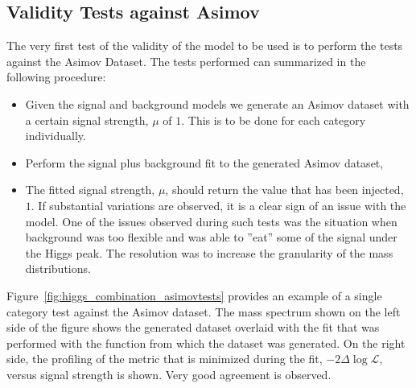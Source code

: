 \subsection{Validity Tests against Asimov}
The very first test of the validity of the model to be used is to perform the
tests against the Asimov Dataset. The tests performed can summarized in the
following procedure:
\begin{itemize}
    \item Given the signal and background models we generate an Asimov dataset with a certain signal strength, $\mu$ of $1$. This is to be done for each category individually.
    \item Perform the signal plus background fit to the generated Asimov dataset,
    \item The fitted signal strength, $\mu$, should return the value that has been injected, $1$. If substantial variations are observed, it is a clear sign of an issue with the model. One of the issues observed during such tests was the situation when background was too flexible and was able to ''eat'' some of the signal under the Higgs peak. The resolution was to increase the granularity of the mass distributions.
\end{itemize}
Figure~\ref{fig:higgs_combination_asimovtests} provides an example of a single category test against the Asimov dataset. The mass spectrum shown on the left side of the figure shows the generated dataset overlaid with the fit that was performed with the function from which the dataset was generated. On the right side, the profiling of the metric that is minimized during the fit, $-2\Delta\log{\mathcal{L}}$, versus signal strength is shown. Very good agreement is observed.
